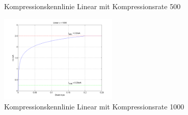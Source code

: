 \documentclass[conference]{IEEEtran}
\begin{document}
\begin{compactenum}[a)]
\begin{figure}
	\vspace{-10pt}
	\caption{Kompressionskennlinie Linear mit Kompressionsrate 500}
	\vspace{-10pt}
	\label{fig:lin_500}
\end{figure}
\begin{figure}[h!]
	\centering
	\includegraphics[width=0.5\textwidth]{img/lin_1000.png}
	\vspace{-10pt}
	\caption{Kompressionskennlinie Linear mit Kompressionsrate 1000}
	\vspace{-10pt}
	\label{fig:lin_1000}
\end{figure}


\end{compactenum}
\end{document}
